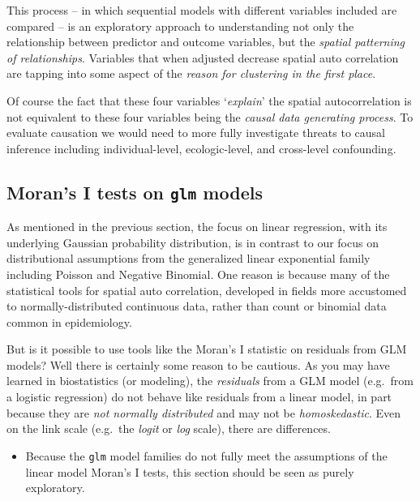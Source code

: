 \documentclass[
]{book}
\newcommand{\passthrough}[1]{#1}
\newenvironment{rmdblock}[1]
  {%
  \begin{itemize}
  \renewcommand{\labelitemi}{
    \raisebox{-.7\height}[0pt][0pt]{
      {\setkeys{Gin}{width=3em,keepaspectratio}\texttt{[image: images/\#1]}}
    }
  }
  \item
  }
  {
  \end{itemize}
  }
\newenvironment{rmdcaution}
  {\begin{rmdblock}{caution}}
  {\end{rmdblock}}
\begin{document}
This process -- in which sequential models with different variables included are compared -- is an exploratory approach to understanding not only the relationship between predictor and outcome variables, but the \emph{spatial patterning of relationships}. Variables that when adjusted decrease spatial auto correlation are tapping into some aspect of the \emph{reason for clustering in the first place}.

Of course the fact that these four variables `\emph{explain}' the spatial autocorrelation is not equivalent to these four variables being the \emph{causal data generating process}. To evaluate causation we would need to more fully investigate threats to causal inference including individual-level, ecologic-level, and cross-level confounding.

\hypertarget{morans-i-tests-on-glm-models}{%
\subsection{\texorpdfstring{Moran's I tests on \texttt{glm} models}{Moran's I tests on glm models}}\label{morans-i-tests-on-glm-models}}

As mentioned in the previous section, the focus on linear regression, with its underlying Gaussian probability distribution, is in contrast to our focus on distributional assumptions from the generalized linear exponential family including Poisson and Negative Binomial. One reason is because many of the statistical tools for spatial auto correlation, developed in fields more accustomed to normally-distributed continuous data, rather than count or binomial data common in epidemiology.

But is it possible to use tools like the Moran's I statistic on residuals from GLM models? Well there is certainly some reason to be cautious. As you may have learned in biostatistics (or modeling), the \emph{residuals} from a GLM model (e.g.~from a logistic regression) do not behave like residuals from a linear model, in part because they are \emph{not normally distributed} and may not be \emph{homoskedastic}. Even on the link scale (e.g.~the \emph{logit} or \emph{log} scale), there are differences.

\begin{rmdcaution}
Because the \passthrough{\lstinline!glm!} model families do not fully meet the assumptions of the linear model Moran's I tests, this section should be seen as purely exploratory.
\end{rmdcaution}
\end{document}
